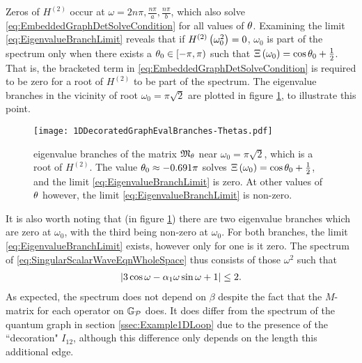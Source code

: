Zeros of $H^{(2)}$ occur at $\omega= 2n\pi, \frac{n\pi}{a}, \frac{n\pi}{b}$, which also solve \eqref{eq:EmbeddedGraphDetSolveCondition} for all values of $\theta$.
Examining the limit \eqref{eq:EigenvalueBranchLimit} reveals that if $H^{(2)}\left( \omega_0^2 \right)=0$, $\omega_0$ is part of the spectrum only when there exists a $\theta_0\in\left[-\pi,\pi\right)$ such that $\Xi\left( \omega_0 \right)=\cos\theta_0+\frac{1}{2}$.
That is, the bracketed term in \eqref{eq:EmbeddedGraphDetSolveCondition} is required to be zero for a root of $H^{(2)}$ to be part of the spectrum.
The eigenvalue branches in the vicinity of root $\omega_0=\pi\sqrt{2}$ are plotted in figure \ref{fig:1DDecoratedGraphEvalBranches-Thetas}, to illustrate this point.
\begin{figure}[t!]
	\centering
	\texttt{[image: 1DDecoratedGraphEvalBranches-Thetas.pdf]}
	\caption{\label{fig:1DDecoratedGraphEvalBranches-Thetas} eigenvalue branches of the matrix $\mathfrak{M}_{\theta}$ near $\omega_0 = \pi\sqrt{2}$, which is a root of $H^{(2)}$. The value $\theta_0\approx-0.691\pi$ solves $\Xi\left( \omega_0 \right)=\cos\theta_0+\frac{1}{2}$, and the limit \eqref{eq:EigenvalueBranchLimit} is zero. At other values of $\theta$ however, the limit \eqref{eq:EigenvalueBranchLimit} is non-zero.}
\end{figure}
It is also worth noting that (in figure \ref{fig:1DDecoratedGraphEvalBranches-Thetas}) there are two eigenvalue branches which are zero at $\omega_0$, with the third being non-zero at $\omega_0$.
For both branches, the limit \eqref{eq:EigenvalueBranchLimit} exists, however only for one is it zero.
The spectrum of \eqref{eq:SingularScalarWaveEqnWholeSpace} thus consists of those $\omega^2$ such that
\begin{align*}
	\left\lvert  3\cos\omega - \alpha_1\omega\sin\omega + 1  \right\rvert \leq 2.
\end{align*}
As expected, the spectrum does not depend on $\beta$ despite the fact that the $M$-matrix for each operator on $\mathbb{G}_{\mathcal{P}}$ does.
It does differ from the spectrum of the quantum graph in section \ref{ssec:Example1DLoop} due to the presence of the ``decoration" $I_{12}$, although this difference only depends on the length this additional edge.

